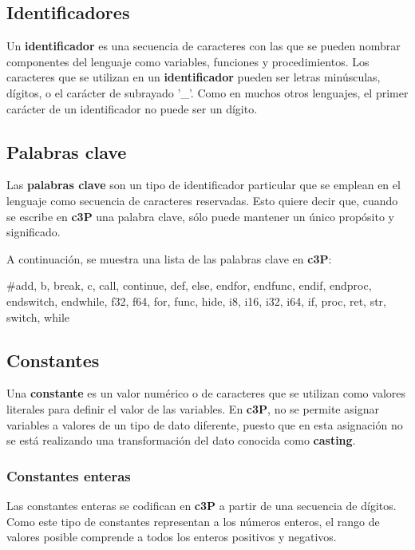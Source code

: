 \subsection{Identificadores}

Un \textbf{identificador} es una secuencia de caracteres con las que se pueden
nombrar componentes del lenguaje como variables, funciones y procedimientos. Los
caracteres que se utilizan en un \textbf{identificador} pueden ser letras minúsculas,
dígitos, o el carácter de subrayado '\_'. Como en muchos otros lenguajes, el primer
carácter de un identificador no puede ser un dígito.

\subsection{Palabras clave}

Las \textbf{palabras clave} son un tipo de identificador particular que se emplean en el
lenguaje como secuencia de caracteres reservadas. Esto quiere decir que, cuando se escribe
en \textbf{c3P} una palabra clave, sólo puede mantener un único propósito y significado.

A continuación, se muestra una lista de las palabras clave en \textbf{c3P}:

\#add, b, break, c, call, continue, def, else, endfor, endfunc, endif, endproc,
endswitch, endwhile, f32, f64, for, func, hide, i8, i16, i32, i64, if, proc,
ret, str, switch,  while

\subsection{Constantes}

Una \textbf{constante} es un valor numérico o de caracteres que se utilizan como valores
literales para definir el valor de las variables. En \textbf{c3P}, no se permite asignar
variables a valores de un tipo de dato diferente, puesto que en esta asignación no se
está realizando una transformación del dato conocida como \textbf{casting}.

\subsubsection{Constantes enteras}

Las constantes enteras se codifican en \textbf{c3P} a partir de una secuencia de dígitos.
Como este tipo de constantes representan a los números enteros, el rango de valores posible
comprende a todos los enteros positivos y negativos.

